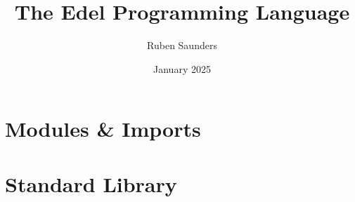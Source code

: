 \documentclass{article}
\title{The Edel Programming Language}
\author{Ruben Saunders}
\date{January 2025}
\begin{document}
    \maketitle
    \tableofcontents

    \newpage

    

    

    

    

    

    

    

    \section{Modules \& Imports}

    \section{Standard Library}
\end{document}
